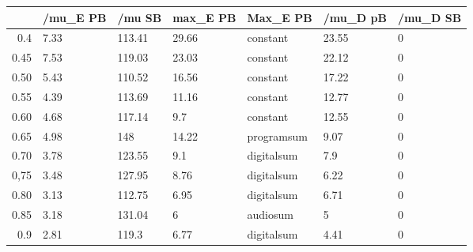 \begin{table}[ht]
\centering
\begin{tabular}{rllllll}
  \hline
 & /mu\_E PB & /mu SB & max\_E PB & Max\_E PB & /mu\_D pB & /mu\_D SB \\ 
  \hline
0.4 & 7.33 & 113.41 & 29.66 & constant & 23.55 & 0 \\ 
  0.45 & 7.53 & 119.03 & 23.03 & constant & 22.12 & 0 \\ 
  0.50 & 5.43 & 110.52 & 16.56 & constant & 17.22 & 0 \\ 
  0.55 & 4.39 & 113.69 & 11.16 & constant & 12.77 & 0 \\ 
  0.60 & 4.68 & 117.14 & 9.7 & constant & 12.55 & 0 \\ 
  0.65 & 4.98 & 148 & 14.22 & programsum & 9.07 & 0 \\ 
  0.70 & 3.78 & 123.55 & 9.1 & digitalsum & 7.9 & 0 \\ 
  0,75 & 3.48 & 127.95 & 8.76 & digitalsum & 6.22 & 0 \\ 
  0.80 & 3.13 & 112.75 & 6.95 & digitalsum & 6.71 & 0 \\ 
  0.85 & 3.18 & 131.04 & 6 & audiosum & 5 & 0 \\ 
  0.9 & 2.81 & 119.3 & 6.77 & digitalsum & 4.41 & 0 \\ 
   \hline
\end{tabular}
\end{table}
